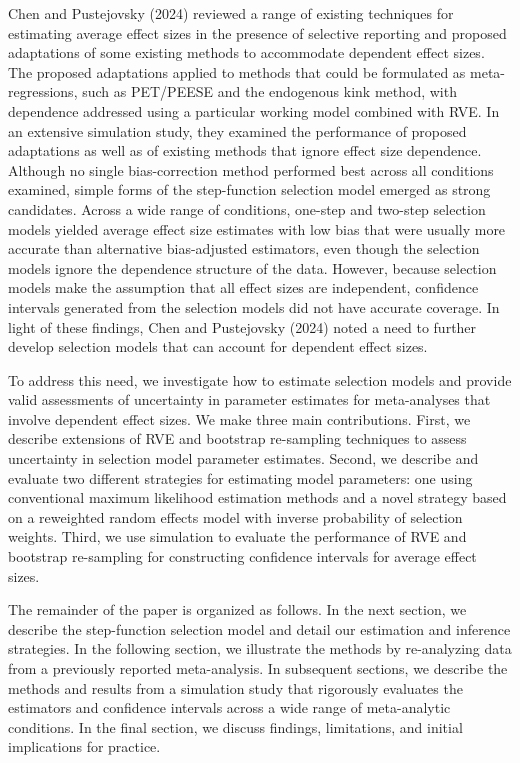 \documentclass[
  man, donotrepeattitle,floatsintext]{apa7}
\begin{document}
Chen and Pustejovsky (2024) reviewed a range of existing techniques for estimating average effect sizes in the presence of selective reporting and proposed adaptations of some existing methods to accommodate dependent effect sizes.
The proposed adaptations applied to methods that could be formulated as meta-regressions, such as PET/PEESE and the endogenous kink method, with dependence addressed using a particular working model combined with RVE.
In an extensive simulation study, they examined the performance of proposed adaptations as well as of existing methods that ignore effect size dependence.
Although no single bias-correction method performed best across all conditions examined, simple forms of the step-function selection model emerged as strong candidates.
Across a wide range of conditions, one-step and two-step selection models yielded average effect size estimates with low bias that were usually more accurate than alternative bias-adjusted estimators, even though the selection models ignore the dependence structure of the data.
However, because selection models make the assumption that all effect sizes are independent, confidence intervals generated from the selection models did not have accurate coverage.
In light of these findings, Chen and Pustejovsky (2024) noted a need to further develop selection models that can account for dependent effect sizes.

To address this need, we investigate how to estimate selection models and provide valid assessments of uncertainty in parameter estimates for meta-analyses that involve dependent effect sizes.
We make three main contributions.
First, we describe extensions of RVE and bootstrap re-sampling techniques to assess uncertainty in selection model parameter estimates.
Second, we describe and evaluate two different strategies for estimating model parameters: one using conventional maximum likelihood estimation methods and a novel strategy based on a reweighted random effects model with inverse probability of selection weights.
Third, we use simulation to evaluate the performance of RVE and bootstrap re-sampling for constructing confidence intervals for average effect sizes.

The remainder of the paper is organized as follows.
In the next section, we describe the step-function selection model and detail our estimation and inference strategies.
In the following section, we illustrate the methods by re-analyzing data from a previously reported meta-analysis.
In subsequent sections, we describe the methods and results from a simulation study that rigorously evaluates the estimators and confidence intervals across a wide range of meta-analytic conditions.
In the final section, we discuss findings, limitations, and initial implications for practice.
\end{document}
